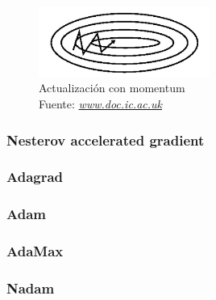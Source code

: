 \begin{figure}[H]
	\centering
	\includegraphics[width=0.5\textwidth]{Figures/momentum2.png}
	\caption{Actualización con momentum \\ Fuente:  \href{https://www.doc.ic.ac.uk/~js4416/163/website/neural-networks/optimisers.html}{\textit{www.doc.ic.ac.uk}}}
	\label{momentum2}
\end{figure}

\subsubsection{Nesterov accelerated gradient}
\subsubsection{Adagrad}
\subsubsection{Adam	}
\subsubsection{AdaMax}
\subsubsection{Nadam}